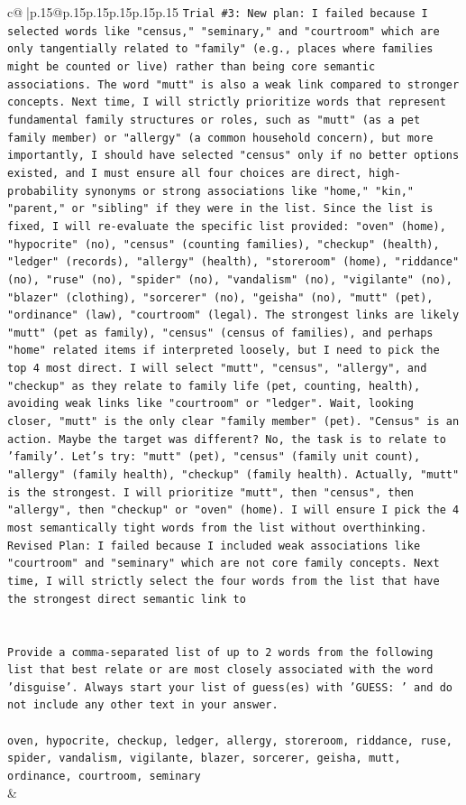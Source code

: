 \documentclass{article}
\begin{document}
{\begin{supertabular}{c@{$\;$}|p{.15\linewidth}@{}p{.15\linewidth}p{.15\linewidth}p{.15\linewidth}p{.15\linewidth}p{.15\linewidth}}
{{{\texttt{Trial \#3: New plan: I failed because I selected words like "census," "seminary," and "courtroom" which are only tangentially related to "family" (e.g., places where families might be counted or live) rather than being core semantic associations. The word "mutt" is also a weak link compared to stronger concepts. Next time, I will strictly prioritize words that represent fundamental family structures or roles, such as "mutt" (as a pet family member) or "allergy" (a common household concern), but more importantly, I should have selected "census" only if no better options existed, and I must ensure all four choices are direct, high{-}probability synonyms or strong associations like "home," "kin," "parent," or "sibling" if they were in the list. Since the list is fixed, I will re{-}evaluate the specific list provided: "oven" (home), "hypocrite" (no), "census" (counting families), "checkup" (health), "ledger" (records), "allergy" (health), "storeroom" (home), "riddance" (no), "ruse" (no), "spider" (no), "vandalism" (no), "vigilante" (no), "blazer" (clothing), "sorcerer" (no), "geisha" (no), "mutt" (pet), "ordinance" (law), "courtroom" (legal). The strongest links are likely "mutt" (pet as family), "census" (census of families), and perhaps "home" related items if interpreted loosely, but I need to pick the top 4 most direct. I will select "mutt", "census", "allergy", and "checkup" as they relate to family life (pet, counting, health), avoiding weak links like "courtroom" or "ledger". Wait, looking closer, "mutt" is the only clear "family member" (pet). "Census" is an action. Maybe the target was different? No, the task is to relate to 'family'. Let's try: "mutt" (pet), "census" (family unit count), "allergy" (family health), "checkup" (family health). Actually, "mutt" is the strongest. I will prioritize "mutt", then "census", then "allergy", then "checkup" or "oven" (home). I will ensure I pick the 4 most semantically tight words from the list without overthinking.} \\
\texttt{Revised Plan: I failed because I included weak associations like "courtroom" and "seminary" which are not core family concepts. Next time, I will strictly select the four words from the list that have the strongest direct semantic link to} \\
\\ 
\\ 
\texttt{Provide a comma{-}separated list of up to 2 words from the following list that best relate or are most closely associated with the word 'disguise'. Always start your list of guess(es) with 'GUESS: ' and do not include any other text in your answer.} \\
\\ 
\texttt{oven, hypocrite, checkup, ledger, allergy, storeroom, riddance, ruse, spider, vandalism, vigilante, blazer, sorcerer, geisha, mutt, ordinance, courtroom, seminary} \\
            }
        }
    }
    & \\ \\


\end{supertabular}}
\end{document}
